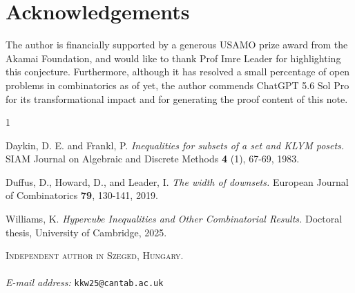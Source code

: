 \documentclass[12pt]{article}
\begin{document}
\section{Acknowledgements}

The author is financially supported by a generous USAMO prize award from the Akamai Foundation, and would like to thank Prof Imre Leader for highlighting this conjecture. Furthermore, although it has resolved a small percentage of open problems in combinatorics as of yet, the author commends ChatGPT 5.6 Sol Pro for its transformational impact and for generating the proof content of this note.

\begin{thebibliography}{1}

    Daykin, D. E. and Frankl, P. {\it Inequalities for subsets of a set and KLYM posets.} SIAM Journal on Algebraic and Discrete Methods {\bf 4} (1), 67-69, 1983.

    Duffus, D., Howard, D., and Leader, I. {\it The width of downsets.} European Journal of Combinatorics {\bf 79}, 130-141, 2019.

    Williams, K. {\it Hypercube Inequalities and Other Combinatorial Results.} Doctoral thesis, University of Cambridge, 2025.

\end{thebibliography}

\textsc{Independent author in Szeged, Hungary.} \\ \\
\textit{E-mail address:} \texttt{kkw25@cantab.ac.uk}
\end{document}
